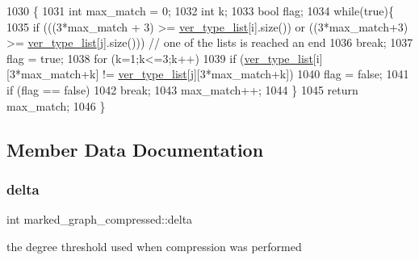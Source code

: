 \begin{DoxyCode}
1030                                                         \{
1031   \textcolor{keywordtype}{int} max\_match = 0;
1032   \textcolor{keywordtype}{int} k;
1033   \textcolor{keywordtype}{bool} flag;
1034   \textcolor{keywordflow}{while}(\textcolor{keyword}{true})\{
1035     \textcolor{keywordflow}{if} (((3*max\_match + 3) >= \hyperlink{classmarked__graph__compressed_af2e3e55223d436628a02758dfae88493}{ver\_type\_list}[i].size()) or ((3*max\_match+3) >= 
      \hyperlink{classmarked__graph__compressed_af2e3e55223d436628a02758dfae88493}{ver\_type\_list}[j].size())) \textcolor{comment}{// one of the lists is reached an end}
1036       \textcolor{keywordflow}{break};
1037     flag = \textcolor{keyword}{true};
1038     \textcolor{keywordflow}{for} (k=1;k<=3;k++)
1039       \textcolor{keywordflow}{if} (\hyperlink{classmarked__graph__compressed_af2e3e55223d436628a02758dfae88493}{ver\_type\_list}[i][3*max\_match+k] != \hyperlink{classmarked__graph__compressed_af2e3e55223d436628a02758dfae88493}{ver\_type\_list}[j][3*max\_match+k])
1040         flag = \textcolor{keyword}{false};
1041     \textcolor{keywordflow}{if} (flag == \textcolor{keyword}{false})
1042       \textcolor{keywordflow}{break};
1043     max\_match++;
1044   \}
1045   \textcolor{keywordflow}{return} max\_match;
1046 \}
\end{DoxyCode}


\subsection{Member Data Documentation}
\mbox{\label{classmarked__graph__compressed_a8b2aaac68e9332ddc78d88eb60b323a7}} 
\subsubsection{\texorpdfstring{delta}{delta}}
{\footnotesize\ttfamily int marked\+\_\+graph\+\_\+compressed\+::delta}



the degree threshold used when compression was performed 

\mbox{\label{classmarked__graph__compressed_af6ff623407b673d08d0cab77b39c2193}} 
